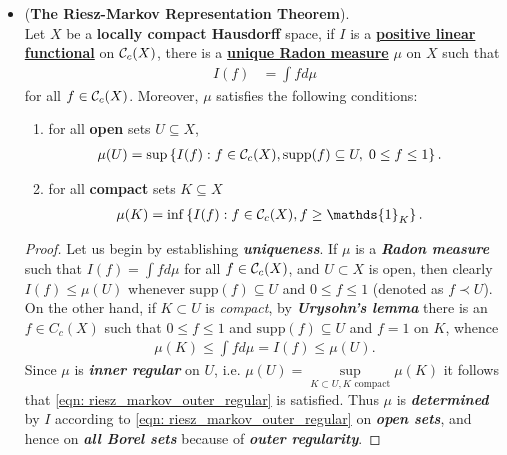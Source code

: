 \documentclass[11pt]{article}
\begin{document}
\begin{itemize}
\item \begin{theorem} (\textbf{The Riesz-Markov Representation Theorem}). \citep{folland2013real}\\
Let $X$ be a \textbf{locally compact Hausdorff} space, if $I$ is a \underline{\textbf{positive linear functional}} on \underline{${\mathcal C}_{c}(X)$}, there is a \underline{\textbf{unique Radon measure}} $\mu$ on $X$ such that
\begin{align*}
I(f) &= \int f d\mu 
\end{align*}
for all $f \in {\mathcal C}_{c}(X)$. Moreover, $\mu$ satisfies the following conditions:
\begin{enumerate}
\item for all \textbf{open} sets $U \subseteq X$,
\begin{align}
\mu(U) &= \sup\left\{I(f): f \in {\mathcal C}_c(X), \text{supp}(f) \subseteq U, \; 0 \le f \le 1\right\}. \label{eqn: riesz_markov_outer_regular}
\end{align} 
\item for all \textbf{compact} sets $K \subseteq X$
\begin{align}
\mu(K) &= \inf\set{I(f): f \in \cC_c(X), f \ge \mathds{1}_{K}}. \label{eqn: riesz_markov_inn_regular}
\end{align}
\end{enumerate}
\end{theorem}
\begin{proof}
Let us begin by establishing \emph{\textbf{uniqueness}}. If $\mu$ is a \emph{\textbf{Radon measure}} such that $I(f) = \int f d\mu$ for all $f \in {\mathcal C}_{c}(X)$, and $U \subset X$ is open, then clearly $I(f) \le  \mu(U)$ whenever $\text{supp}(f) \subseteq U$ and $0 \le f \le 1$ (denoted as $f \prec U$).  On the other hand, if $K \subset U$ is \emph{compact}, by \emph{\textbf{Urysohn's lemma}} there is an $f  \in C_{c}(X)$ such that $0 \le f \le 1$  and $\text{supp}(f) \subseteq U$ and $f = 1$ on $K$, whence 
\begin{align*}
\mu(K) \le \int f d\mu = I(f) \le \mu(U).
\end{align*}
Since $\mu$ is \emph{\textbf{inner regular}} on $U$, i.e. $\mu(U) = \sup\limits_{K\subset U, K\text{ compact}}\mu(K)$ it follows that \eqref{eqn: riesz_markov_outer_regular} is satisfied. Thus $\mu$ is \emph{\textbf{determined}} by $I$ according to  \eqref{eqn: riesz_markov_outer_regular} on \emph{\textbf{open sets}}, and hence on \emph{\textbf{all Borel sets}} because of \emph{\textbf{outer regularity}}.



\end{proof}
\end{itemize}
\end{document}
